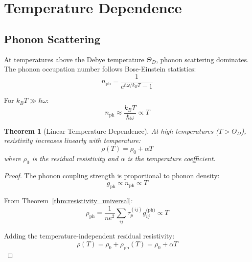 \documentclass[twocolumn,showpacs,preprintnumbers,amsmath,amssymb,prd]{revtex4-2}
\newtheorem{theorem}{Theorem}[section]
\newcommand{\taup}{\tau_p}
\begin{document}
\section{Temperature Dependence}
\label{sec:temperature}

\subsection{Phonon Scattering}

At temperatures above the Debye temperature $\Theta_D$, phonon scattering dominates. The phonon occupation number follows Bose-Einstein statistics:
\begin{equation}
n_{\text{ph}} = \frac{1}{e^{\hbar\omega/k_BT} - 1}
\label{eq:bose_einstein}
\end{equation}

For $k_BT \gg \hbar\omega$:
\begin{equation}
n_{\text{ph}} \approx \frac{k_BT}{\hbar\omega} \propto T
\label{eq:phonon_high_t}
\end{equation}

\begin{theorem}[Linear Temperature Dependence]
\label{thm:linear_t}
At high temperatures ($T > \Theta_D$), resistivity increases linearly with temperature:
\begin{equation}
\rho(T) = \rho_0 + \alpha T
\label{eq:linear_rho}
\end{equation}
where $\rho_0$ is the residual resistivity and $\alpha$ is the temperature coefficient.
\end{theorem}

\begin{proof}
The phonon coupling strength is proportional to phonon density:
\begin{equation}
g_{\text{ph}} \propto n_{\text{ph}} \propto T
\label{eq:phonon_coupling_t}
\end{equation}

From Theorem~\ref{thm:resistivity_universal}:
\begin{equation}
\rho_{\text{ph}} = \frac{1}{ne^2} \sum_{ij} \taup^{(ij)} g_{ij}^{\text{(ph)}} \propto T
\label{eq:rho_ph_t}
\end{equation}

Adding the temperature-independent residual resistivity:
\begin{equation}
\rho(T) = \rho_0 + \rho_{\text{ph}}(T) = \rho_0 + \alpha T
\end{equation}
\end{proof}
\end{document}
